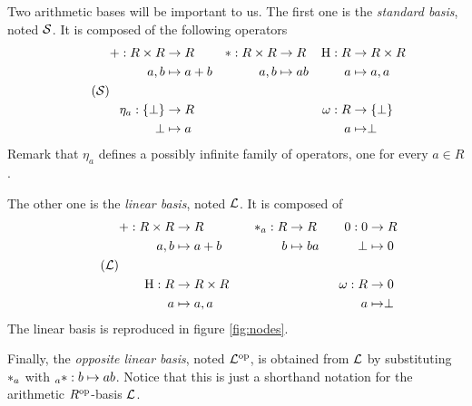 Two arithmetic bases will be important to us. The first one is the
\emph{standard basis}, noted $\mathcal{S}$. It is composed of the
following operators
\begin{equation}
  \label{eq:sbasis}
  \tag{$\Sbasis$}
  \begin{aligned}
    + : R\times R &\ra R    & * : R\times R &\ra R &  \hub : R &\ra R\times R\\
        a, b &\mapsto a+b   &     a, b &\mapsto ab &         a &\mapsto a,a\\ \\
    \eta_a : \{\bom\} &\ra R     &&& \omega : R &\ra \{\bom\} \\
          \bom &\mapsto a &&&          a &\mapsto \bom
  \end{aligned}
\end{equation}
Remark that $\eta_a$ defines a possibly infinite family of operators,
one for every $a\in R$.

The other one is the \emph{linear basis}, noted $\mathcal{L}$.  It
is composed of
\begin{equation*}
  \label{eq:tbasis}
  \tag{$\Tbasis$}
  \begin{aligned}
    + : R\times R &\ra R    &\quad
    \rmul{a} : R &\ra R      &\quad
    0 : 0 &\ra R  \\
    a, b &\mapsto a+b   &
    b &\mapsto ba &  
    \bom &\mapsto 0  \\
    \\
    \hub : R &\ra R\times R  &\quad
    &&
    \omega : R &\ra 0 \\
    a &\mapsto a,a    &
    &&
    a &\mapsto \bom
  \end{aligned}
\end{equation*}
The linear basis is reproduced in figure \ref{fig:nodes}.

Finally, the \emph{opposite linear basis}, noted $\mathcal{L}^{\mathrm{op}}$, is
obtained from $\mathcal{L}$ by substituting $*_{a}$ with
${}_{a}*:b\mapsto ab$. Notice that this is just a shorthand notation
for the arithmetic $R^{\mathrm{op}}$-basis $\mathcal{L}$.

